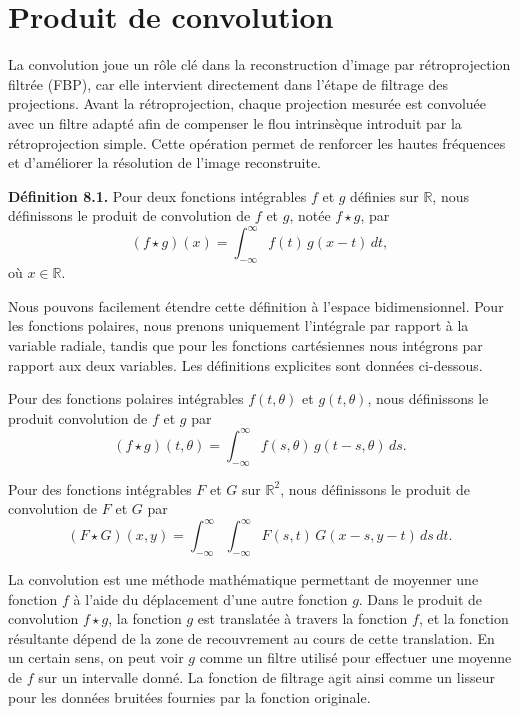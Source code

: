 \section{Produit de convolution}
La convolution joue un rôle clé dans la reconstruction d'image par rétroprojection filtrée (FBP), car elle intervient directement dans l'étape de filtrage des projections. Avant la rétroprojection, chaque projection mesurée est convoluée avec un filtre adapté afin de compenser le flou intrinsèque introduit par la rétroprojection simple. Cette opération permet de renforcer les hautes fréquences et d'améliorer la résolution de l'image reconstruite.

\textbf{Définition 8.1.}
Pour deux fonctions intégrables $f$ et $g$ définies sur $\mathbb{R}$,
nous définissons le produit de convolution de $f$ et $g$, notée $f \star g$, par
\begin{equation}
(f \star g)(x) = \int_{-\infty}^{\infty} f(t)\,g(x - t)\,dt,
\end{equation}
où $x \in \mathbb{R}$.

Nous pouvons facilement étendre cette définition à l'espace
bidimensionnel. Pour les fonctions polaires, nous prenons uniquement
l'intégrale par rapport à la variable radiale, tandis que pour les
fonctions cartésiennes nous intégrons par rapport aux deux variables.
Les définitions explicites sont données ci-dessous.

\begin{definition}
    Pour des fonctions polaires intégrables $f(t,\theta)$ et $g(t,\theta)$,
    nous définissons le produit convolution de $f$ et $g$ par
    \begin{equation}
        (f \star g)(t,\theta)
        =
        \int_{-\infty}^{\infty}
        f(s,\theta)\,g(t - s,\theta)\,ds.
    \end{equation}
\end{definition}

Pour des fonctions intégrables $F$ et $G$ sur $\mathbb{R}^2$,
nous définissons le produit de convolution de $F$ et $G$ par
\begin{equation}
    (F \star G)(x,y)
    =
    \int_{-\infty}^{\infty}
    \int_{-\infty}^{\infty}
    F(s,t)\,G(x - s, y - t)\,ds\,dt.
\end{equation}

La convolution est une méthode mathématique permettant de moyenner
une fonction $f$ à l'aide du déplacement d'une autre fonction $g$.
Dans le produit de convolution $f \star g$, la fonction $g$ est translatée à travers
la fonction $f$, et la fonction résultante dépend de la zone de recouvrement
au cours de cette translation.
En un certain sens, on peut voir $g$ comme un filtre utilisé pour effectuer
une moyenne de $f$ sur un intervalle donné.
La fonction de filtrage agit ainsi comme un lisseur pour les données bruitées
fournies par la fonction originale.

